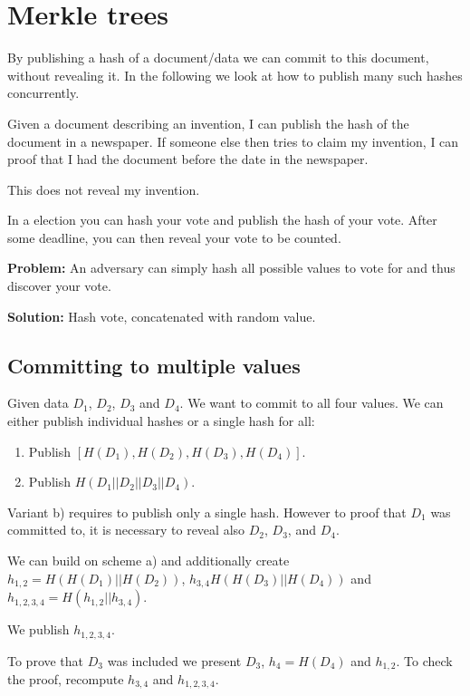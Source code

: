 
\section{Merkle trees}
By publishing a hash of a document/data we can commit to this document, without revealing it. In the following we look at how to publish many such hashes concurrently.

\begin{example}
Given a document describing an invention, I can publish the hash of the document in a newspaper. If someone else then tries to claim my invention, I can proof that I had the document before the date in the newspaper.

This does not reveal my invention.
\end{example}

\begin{example}
In a election you can hash your vote and publish the hash of your vote. After some deadline, you can then reveal your vote to be counted.

\textbf{Problem:} An adversary can simply hash all possible values to vote for and thus discover your vote.

\textbf{Solution:} Hash vote, concatenated with random value.
\end{example}

\subsection{Committing to multiple values}
Given data $D_1$, $D_2$, $D_3$ and $D_4$. We want to commit to all four values.
We can either publish individual hashes or a single hash for all:
\begin{enumerate}[label=\alph*)]
	\item Publish $[H(D_1),H(D_2),H(D_3),H(D_4)]$.
	\item Publish $H(D_1||D_2||D_3||D_4)$.
\end{enumerate}

Variant b) requires to publish only a single hash. However to proof that $D_1$ was committed to, it is necessary to reveal also $D_2$, $D_3$, and $D_4$.

\begin{example}
We can build on scheme a) and additionally create $h_{1,2}=H(H(D_1) || H(D_2))$, 
$h_{3,4} H(H(D_3) || H(D_4))$ and $h_{1,2,3,4}= H(h_{1,2}|| h_{3,4})$.

We publish $h_{1,2,3,4}$. 

To prove that $D_3$ was included we present $D_3$, $h_4=H(D_4)$ and $h_{1,2}$.
To check the proof, recompute $h_{3,4}$ and $h_{1,2,3,4}$.
\end{example}

